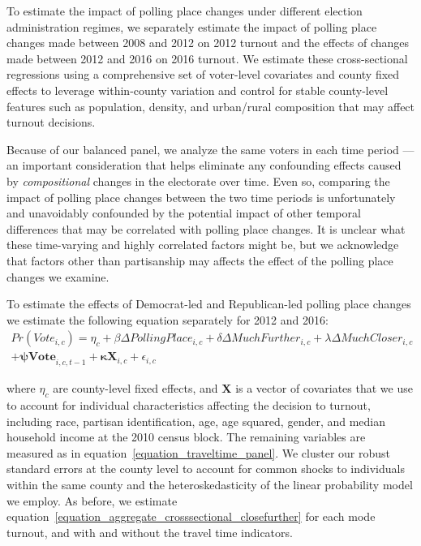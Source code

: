 \documentclass{cup_PSRM}
\begin{document}



To estimate the impact of polling place changes under different election administration regimes, we separately estimate the impact of polling place changes made between 2008 and 2012 on 2012 turnout and the effects of changes made between 2012 and 2016 on 2016 turnout. We estimate these cross-sectional regressions using a comprehensive set of voter-level covariates and county fixed effects to leverage within-county variation and control for stable county-level features such as population, density, and urban/rural composition that may affect turnout decisions.

Because of our balanced panel, we analyze the same voters in each time period --- an important consideration that helps eliminate any confounding effects caused by \emph{compositional} changes in the electorate over time. Even so, comparing the impact of polling place changes between the two time periods is unfortunately and unavoidably confounded by the potential impact of other temporal differences that may be correlated with polling place changes. It is unclear what these time-varying and highly correlated factors might be, but we acknowledge that factors other than partisanship may affects the effect of the polling place changes we examine.

To estimate the effects of Democrat-led and Republican-led polling place changes we estimate the following equation separately for 2012 and 2016:
\begin{align}\label{equation_aggregate_crosssectional_closefurther}
	Pr(Vote_{i,c}) = \eta_{c} + \beta \Delta PollingPlace_{i,c} + \delta \Delta MuchFurther_{i,c} + \lambda \Delta MuchCloser_{i,c}  \\
    + \boldsymbol{\psi Vote}_{i,c,t-1} +   \boldsymbol{\kappa X}_{i,c}  + \epsilon_{i,c} \nonumber
\end{align}

where $\eta_{c}$ are county-level fixed effects, and $\boldsymbol{X}$ is a vector of covariates that we use to account for individual characteristics affecting the decision to turnout, including race, partisan identification, age, age squared, gender, and median household income at the 2010 census block. The remaining variables are measured as in equation~\ref{equation_traveltime_panel}.  We cluster our robust standard errors at the county level to account for common shocks to individuals within the same county and the heteroskedasticity of the linear probability model we employ.  As before, we estimate equation~\ref{equation_aggregate_crosssectional_closefurther} for each mode turnout, and with and without the travel time indicators.
\end{document}

